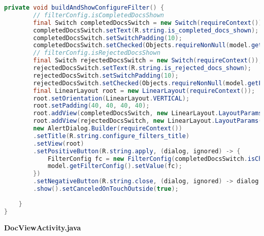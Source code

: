 \begin{lstlisting}[language=Java]
	private void buildAndShowConfigureFilter() {
		// filterConfig.isCompletedDocsShown
		final Switch completedDocsSwitch = new Switch(requireContext());
		completedDocsSwitch.setText(R.string.is_completed_docs_shown);
		completedDocsSwitch.setSwitchPadding(10);
		completedDocsSwitch.setChecked(Objects.requireNonNull(model.getFilterConfig().getValue()).isCompletedDocsShown());
		// filterConfig.isRejectedDocsShown
		final Switch rejectedDocsSwitch = new Switch(requireContext());
		rejectedDocsSwitch.setText(R.string.is_rejected_docs_shown);
		rejectedDocsSwitch.setSwitchPadding(10);
		rejectedDocsSwitch.setChecked(Objects.requireNonNull(model.getFilterConfig().getValue()).isRejectedDocsShown());
		final LinearLayout root = new LinearLayout(requireContext());
		root.setOrientation(LinearLayout.VERTICAL);
		root.setPadding(40, 40, 40, 40);
		root.addView(completedDocsSwitch, new LinearLayout.LayoutParams(LinearLayout.LayoutParams.WRAP_CONTENT, LinearLayout.LayoutParams.WRAP_CONTENT));
		root.addView(rejectedDocsSwitch, new LinearLayout.LayoutParams(LinearLayout.LayoutParams.WRAP_CONTENT, LinearLayout.LayoutParams.WRAP_CONTENT));
		new AlertDialog.Builder(requireContext())
		.setTitle(R.string.configure_filters_title)
		.setView(root)
		.setPositiveButton(R.string.apply, (dialog, ignored) -> {
			FilterConfig fc = new FilterConfig(completedDocsSwitch.isChecked(), rejectedDocsSwitch.isChecked());
			model.getFilterConfig().setValue(fc);
		})
		.setNegativeButton(R.string.close, (dialog, ignored) -> dialog.cancel())
		.show().setCanceledOnTouchOutside(true);
		
	}
}
\end{lstlisting}
\textbf{DocViewActivity.java}
